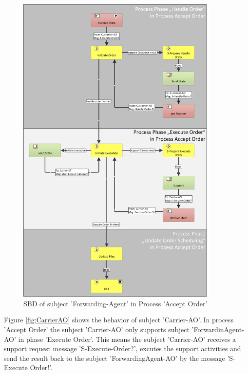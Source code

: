 \begin{figure}[hbtp]
 \begin{center}
	\includegraphics[width=0.9\textwidth]{Figures/Chapter5/Subject-Phase/SBD-ForwardingAGentAO_NEW.png}
	\caption{SBD of subject 'Forwarding-Agent' in Process 'Accept Order'}
	\label{fig:SBD-ForwardingAGentAO}
	\end{center}
\end{figure}


Figure \ref{fig:CarrierAO} shows the behavior of subject 'Carrier-AO'. In process 'Accept Order' the subject 'Carrier-AO' only supports subject 'ForwardinAgent-AO' in phase 'Execute Order'. This means the subject 'Carrier-AO' receives a support request message 'S-Execute-Order?', excutes the support activities and send the result back to the subject 'ForwardingAgent-AO' by the message 'S-Execute Order!'.

